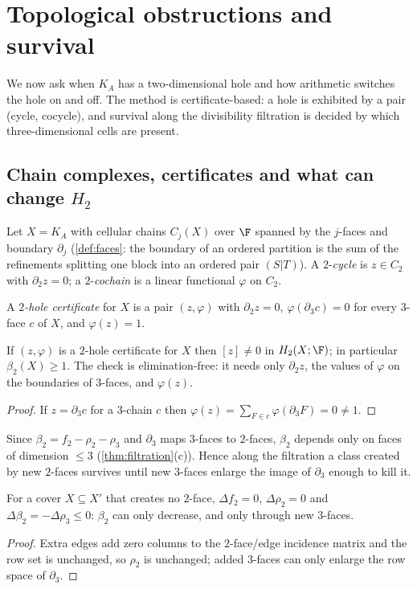 \chapter{Topological obstructions and survival}\label{ch:topology}

We now ask when $K_A$ has a two-dimensional hole and how arithmetic switches the hole on and off. The method is certificate-based: a hole is exhibited by a pair (cycle, cocycle), and survival along the divisibility filtration is decided by which three-dimensional cells are present.

\section{Chain complexes, certificates and what can change \texorpdfstring{$H_2$}{H2}}
Let $X=K_A$ with cellular chains $C_j(X)$ over $\F$ spanned by the $j$-faces and boundary $\partial_j$ (\cref{def:faces}: the boundary of an ordered partition is the sum of the refinements splitting one block into an ordered pair $(S|T)$). A $2$-\emph{cycle} is $z\in C_2$ with $\partial_2z=0$; a $2$-\emph{cochain} is a linear functional $\varphi$ on $C_2$.
\begin{definition}\label{def:certificate}
A \emph{$2$-hole certificate} for $X$ is a pair $(z,\varphi)$ with $\partial_2z=0$, $\varphi(\partial_3c)=0$ for every $3$-face $c$ of $X$, and $\varphi(z)=1$.
\end{definition}
\begin{lemma}\label{lem:certificate}
If $(z,\varphi)$ is a $2$-hole certificate for $X$ then $[z]\ne0$ in $H_2(X;\F)$; in particular $\beta_2(X)\ge1$. The check is elimination-free: it needs only $\partial_2z$, the values of $\varphi$ on the boundaries of $3$-faces, and $\varphi(z)$.
\end{lemma}
\begin{proof}
If $z=\partial_3c$ for a $3$-chain $c$ then $\varphi(z)=\sum_{F\in c}\varphi(\partial_3F)=0\ne1$.
\end{proof}
Since $\beta_2=f_2-\rho_2-\rho_3$ and $\partial_3$ maps $3$-faces to $2$-faces, $\beta_2$ depends only on faces of dimension $\le3$ (\cref{thm:filtration}(c)). Hence along the filtration a class created by new $2$-faces survives until new $3$-faces enlarge the image of $\partial_3$ enough to kill it.
\begin{proposition}\label{prop:H2-low}
For a cover $X\subseteq X'$ that creates no $2$-face, $\Delta f_2=0$, $\Delta\rho_2=0$ and $\Delta\beta_2=-\Delta\rho_3\le0$: $\beta_2$ can only decrease, and only through new $3$-faces.
\end{proposition}
\begin{proof}
Extra edges add zero columns to the $2$-face/edge incidence matrix and the row set is unchanged, so $\rho_2$ is unchanged; added $3$-faces can only enlarge the row space of $\partial_3$.
\end{proof}


